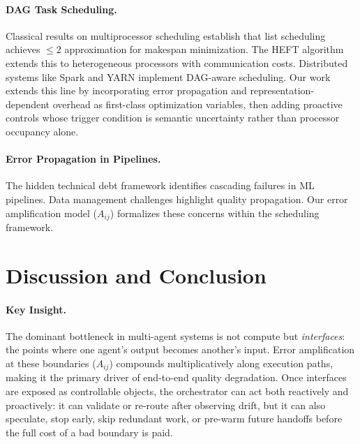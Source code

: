 \documentclass[10pt, twocolumn]{article}
\begin{document}
\paragraph{DAG Task Scheduling.}
Classical results on multiprocessor scheduling \citep{graham1966bounds, coffman1972optimal} establish that list scheduling achieves $\leq 2$ approximation for makespan minimization. The HEFT algorithm \citep{topcuoglu2002heft} extends this to heterogeneous processors with communication costs. Distributed systems like Spark \citep{zaharia2010spark} and YARN \citep{vavilapalli2013yarn} implement DAG-aware scheduling. Our work extends this line by incorporating error propagation and representation-dependent overhead as first-class optimization variables, then adding proactive controls whose trigger condition is semantic uncertainty rather than processor occupancy alone.

\paragraph{Error Propagation in Pipelines.}
The hidden technical debt framework \citep{sculley2015hidden} identifies cascading failures in ML pipelines. Data management challenges \citep{polyzotis2017data} highlight quality propagation. Our error amplification model ($A_{ij}$) formalizes these concerns within the scheduling framework.

\section{Discussion and Conclusion}
\label{sec:discussion}

\paragraph{Key Insight.}
The dominant bottleneck in multi-agent systems is not compute but \emph{interfaces}: the points where one agent's output becomes another's input. Error amplification at these boundaries ($A_{ij}$) compounds multiplicatively along execution paths, making it the primary driver of end-to-end quality degradation. Once interfaces are exposed as controllable objects, the orchestrator can act both reactively and proactively: it can validate or re-route after observing drift, but it can also speculate, stop early, skip redundant work, or pre-warm future handoffs before the full cost of a bad boundary is paid.
\end{document}
